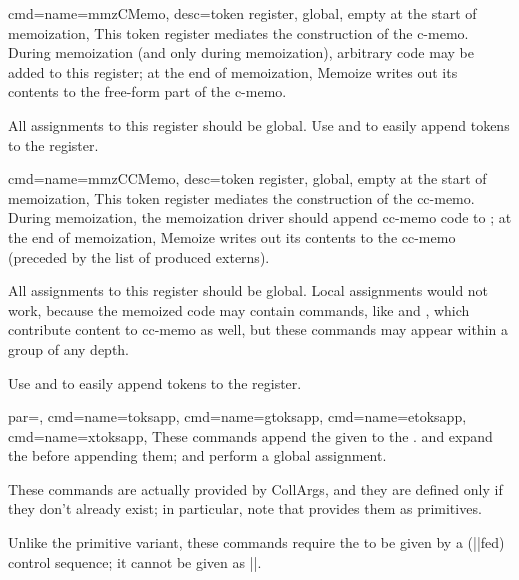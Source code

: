 \documentclass[a4paper,11pt]{article}
\begin{document}
\begin{doc}{
    cmd={name=mmzCMemo, desc={token register, global, empty at the start of memoization}},
  }
  This token register mediates the construction of the c-memo.  During
  memoization (and only during memoization), arbitrary code may be added to
  this register; at the end of memoization, Memoize writes out its contents to
  the free-form part of the c-memo.

  All assignments to this register should be global.  Use  and
   to easily append tokens to the register.
\end{doc}


\begin{doc}{
    cmd={name=mmzCCMemo, desc={token register, global, empty at the start of memoization}},
  }
  This token register mediates the construction of the cc-memo.  During
  memoization, the memoization driver should append cc-memo code to
  ; at the end of memoization, Memoize writes out its
  contents to the cc-memo (preceded by the list of produced externs).

  All assignments to this register should be global.  Local assignments would
  not work, because the memoized code may contain commands, like  and
  , which contribute content to cc-memo as well, but these commands may
  appear within a  group of any depth.

  Use  and  to easily append tokens to the
  register.
\end{doc}

\begin{doc}{
    par=,
    cmd={name=toksapp},
    cmd={name=gtoksapp},
    cmd={name=etoksapp},
    cmd={name=xtoksapp},
  }
  These commands append the given  to the .
   and  expand the  before
  appending them;  and  perform a global
  assignment.

  These commands are actually provided by CollArgs, and they are defined only
  if they don't already exist; in particular, note that 
  provides them as primitives.

  Unlike the  primitive variant, these commands require the
   to be given by a (|\toksdef|fed) control sequence; it
  cannot be given as |\toks|.
\end{doc}
\end{document}
